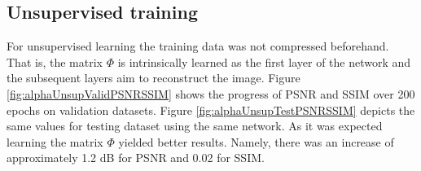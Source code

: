 
\FloatBarrier

\subsection{Unsupervised training}
For unsupervised learning the training data was not compressed beforehand. That is, the matrix $\Phi$ is intrinsically learned as the first layer of the network and the subsequent layers aim to reconstruct the image. Figure \ref{fig:alphaUnsupValidPSNRSSIM}  shows the progress of PSNR and SSIM over 200 epochs on validation datasets. Figure \ref{fig:alphaUnsupTestPSNRSSIM} depicts the same values for testing dataset using the same network. As it was expected learning the matrix $\Phi$ yielded better results. Namely, there was an increase of approximately 1.2 dB for PSNR and 0.02 for SSIM.    

%
%
%

